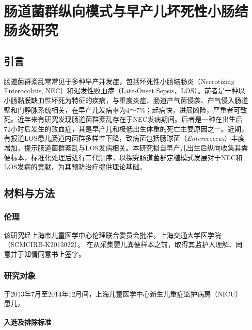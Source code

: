 
\chapter{肠道菌群纵向模式与早产儿坏死性小肠结肠炎研究}
\label{chap:nec}

\section{引言}
肠道菌群紊乱常常见于多种早产并发症，包括坏死性小肠结肠炎（Necrotizing Enterocolitis, NEC）和迟发性败血症（Late-Onset Sepsis，LOS）。前者是一种以小肠黏膜缺血性坏死为特征的疾病，与重度炎症、肠道产气菌侵袭、产气侵入肠道壁和门静脉系统相关\cite{neu2011necrotizing}，在早产儿发病率为4～7\%\cite{rees2010national}；起病快，进展凶险，严重者可致死。近年来有研究发现肠道菌群紊乱存在于NEC发病期间。后者是一种在出生后72小时后发生的败血症，其是早产儿和极低出生体重的死亡主要原因之一\cite{stoll2002late}。近期，有报道LOS患儿肠道内菌群多样性下降\cite{mai2013distortions}，致病菌包括肠球菌（\textit{Enterococcus}）丰度增加\cite{stewart2017longitudinal}，提示肠道菌群紊乱与LOS发病相关。本研究拟自早产儿出生后纵向收集其粪便标本，标准化处理后进行二代测序，以探究肠道菌群定植模式发展对于NEC和LOS发病的贡献，为其预防治疗提供理论基础。

\section{材料与方法}
  \subsection{伦理}
  该研究经上海市儿童医学中心伦理联合委员会批准，上海交通大学医学院（SCMCIRB-K2013022）。 在从采集婴儿粪便样本之前，取得其监护人理解、同意并于知情同意书上签字。
  \subsection{研究对象}
  于2013年7月至2014年12月间，上海儿童医学中心新生儿重症监护病房（NICU）患儿，
    \subsubsection{入选及排除标准}
